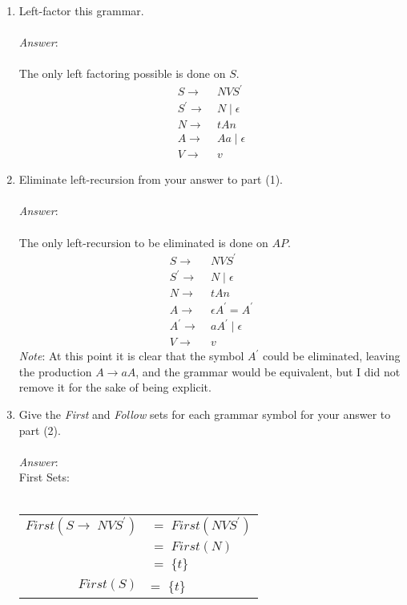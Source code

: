 \documentclass[fleqn]{article}
\begin{document}
\begin{enumerate}
  \item Left-factor this grammar.\\\\
  \textit{Answer}:\\\\
  The only left factoring possible is done on $S$.
  \begin{align*}
    S          \rightarrow& \; N V S^{\prime} \\
    S^{\prime} \rightarrow& \; N \; | \; \epsilon \\
    N          \rightarrow& \; t A n \\
    A          \rightarrow& \; A a \; | \; \epsilon \\
    V          \rightarrow& \; v
  \end{align*}

  \item Eliminate left-recursion from your answer to part (1).\\\\
  \textit{Answer}:\\\\
  The only left-recursion to be eliminated is done on $AP$.
  \begin{align*}
    S           \rightarrow& \; N V S^{\prime} \\
    S^{\prime}  \rightarrow& \; N \; | \; \epsilon \\
    N           \rightarrow& \; t A n \\
    A           \rightarrow& \; \epsilon A^{\prime} = A^{\prime} \\
    A^{\prime}  \rightarrow& \; a A^{\prime} \; | \; \epsilon \\
    V           \rightarrow& \; v
  \end{align*}
  \textit{Note}: At this point it is clear that the symbol $A^{\prime}$ could
  be eliminated, leaving the production $A \rightarrow a A$, and the grammar
  would be equivalent, but I did not remove it for the sake of being
  explicit.

  \newpage
  \item Give the \textit{First} and \textit{Follow} sets for each grammar
  symbol for your answer to part (2).\\\\
  \textit{Answer}:\\

  First Sets:\\\\
  \begin{tabular}{| r   l |}
  \hline
  $First(S \rightarrow \; N V S^{\prime})$ & $= \; First(N V S^{\prime})$ \\
                                           & $= \; First(N)$              \\
                                           & $= \; \{t\}$                 \\
  \hline
  \hline
  $First(S)$                               & = $\; \{t\}$                 \\
  \hline
  \end{tabular}\\\\


\end{enumerate}
\end{document}
